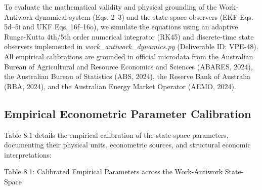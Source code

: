 \documentclass[preprint,12pt,authoryear]{elsarticle}
\theoremstyle{definition}
\begin{document}
  

To evaluate the mathematical validity and physical grounding of the Work-Antiwork dynamical system (Eqs. 2--3) and the state-space observers (EKF Eqs. 5d--5i and UKF Eqs. 16f--16o), we simulate the equations using an adaptive Runge-Kutta 4th/5th order numerical integrator (RK45) and discrete-time state observers implemented in \textit{work\_antiwork\_dynamics.py} (Deliverable ID: VPE-48). All empirical calibrations are grounded in official microdata from the Australian Bureau of Agricultural and Resource Economics and Sciences (ABARES, 2024), the Australian Bureau of Statistics (ABS, 2024), the Reserve Bank of Australia (RBA, 2024), and the Australian Energy Market Operator (AEMO, 2024).

\subsection{Empirical Econometric Parameter Calibration}

Table 8.1 details the empirical calibration of the state-space parameters, documenting their physical units, econometric sources, and structural economic interpretations:

Table 8.1: Calibrated Empirical Parameters across the Work-Antiwork State-Space
\end{document}
